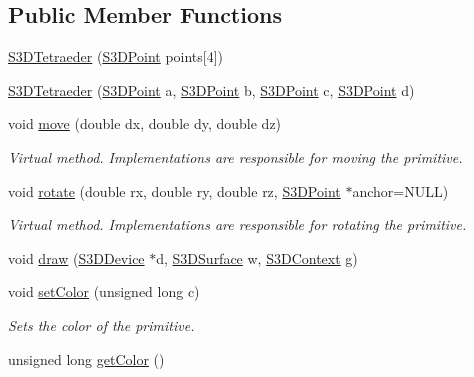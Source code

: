 \subsection*{Public Member Functions}
\begin{DoxyCompactItemize}
\item 
\hyperlink{class_s3_d_tetraeder_ac70078c42e24160a8759fafff847ee30}{S3DTetraeder} (\hyperlink{class_s3_d_point}{S3DPoint} points\mbox{[}4\mbox{]})
\item 
\hyperlink{class_s3_d_tetraeder_a98dc7f23bd82419321b7a086159e25d3}{S3DTetraeder} (\hyperlink{class_s3_d_point}{S3DPoint} a, \hyperlink{class_s3_d_point}{S3DPoint} b, \hyperlink{class_s3_d_point}{S3DPoint} c, \hyperlink{class_s3_d_point}{S3DPoint} d)
\item 
void \hyperlink{class_s3_d_tetraeder_a3acda1d545e2f078abf299b1c424b7bc}{move} (double dx, double dy, double dz)
\begin{DoxyCompactList}\small\item\em Virtual method. Implementations are responsible for moving the primitive. \item\end{DoxyCompactList}\item 
void \hyperlink{class_s3_d_tetraeder_aa06cc6b851e9a3abce9f68830340007a}{rotate} (double rx, double ry, double rz, \hyperlink{class_s3_d_point}{S3DPoint} $\ast$anchor=NULL)
\begin{DoxyCompactList}\small\item\em Virtual method. Implementations are responsible for rotating the primitive. \item\end{DoxyCompactList}\item 
void \hyperlink{class_s3_d_tetraeder_a35594d3c61c89fa1dbe7a6a115cea56b}{draw} (\hyperlink{types_8h_a25c0773a29204332721bde1b164d0b84}{S3DDevice} $\ast$d, \hyperlink{types_8h_a4afc89c514af26434688c7e8b382ba5e}{S3DSurface} w, \hyperlink{types_8h_a46f30693e0040340e595d8228cc31779}{S3DContext} g)
\item 
void \hyperlink{class_s3_d_tetraeder_a99856377365e5c26c1f86155909725ed}{setColor} (unsigned long c)
\begin{DoxyCompactList}\small\item\em Sets the color of the primitive. \item\end{DoxyCompactList}\item 
unsigned long \hyperlink{class_s3_d_tetraeder_ab79d98573d008f21c9a77f9d3633d6ae}{getColor} ()

\end{DoxyCompactItemize}
